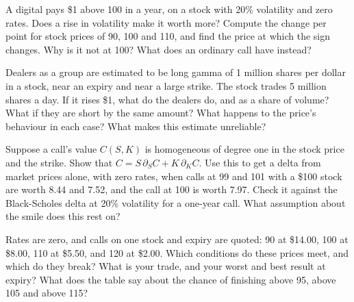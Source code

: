 \begin{question}\label{iq:iv2:options-parity-and-greeks:44}
A digital pays \$1 above 100 in a year, on a stock with 20\% volatility and zero rates. Does a rise in volatility make it worth more? Compute the change per point for stock prices of 90, 100 and 110, and find the price at which the sign changes. Why is it not at 100? What does an ordinary call have instead?
\end{question}

\begin{question}\label{iq:iv2:options-parity-and-greeks:45}
Dealers as a group are estimated to be long gamma of 1 million shares per dollar in a stock, near an expiry and near a large strike. The stock trades 5 million shares a day. If it rises \$1, what do the dealers do, and as a share of volume? What if they are short by the same amount? What happens to the price's behaviour in each case? What makes this estimate unreliable?
\end{question}

\begin{question}\label{iq:iv2:options-parity-and-greeks:46}
Suppose a call's value $C(S, K)$ is homogeneous of degree one in the stock price and the strike. Show that $C = S\,\partial_S C + K\,\partial_K C$. Use this to get a delta from market prices alone, with zero rates, when calls at 99 and 101 with a \$100 stock are worth 8.44 and 7.52, and the call at 100 is worth 7.97. Check it against the Black-Scholes delta at 20\% volatility for a one-year call. What assumption about the smile does this rest on?
\end{question}

\begin{question}\label{iq:iv2:options-parity-and-greeks:47}
Rates are zero, and calls on one stock and expiry are quoted: 90 at \$14.00, 100 at \$8.00, 110 at \$5.50, and 120 at \$2.00. Which conditions do these prices meet, and which do they break? What is your trade, and your worst and best result at expiry? What does the table say about the chance of finishing above 95, above 105 and above 115?
\end{question}

